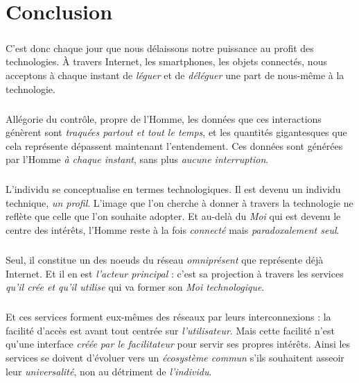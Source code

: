 \chapter{Conclusion}

\paragraph{} C'est donc chaque jour que nous délaissons notre puissance au profit des
technologies. À travers Internet, les smartphones, les objets connectés, nous acceptons
à chaque instant de \emph{léguer} et de \emph{déléguer} une part de nous-même à la 
technologie. 

\paragraph{} Allégorie du contrôle, propre de l'Homme, les données que ces
interactions génèrent sont \emph{traquées partout et tout le temps}, et les quantités
gigantesques que cela représente dépassent maintenant l'entendement. Ces données sont
générées par l'Homme \emph{à chaque instant}, sans plus \emph{aucune interruption}. 

\paragraph{} L'individu se conceptualise en termes technologiques. Il est devenu un
individu technique, \emph{un profil}. L'image que l'on cherche à donner à travers la
technologie ne reflète que celle que l'on souhaite adopter. Et au-delà du \emph{Moi}
qui est devenu le centre des intérêts, l'Homme reste à la fois \emph{connecté} mais
\emph{paradoxalement seul}.

\paragraph{} Seul, il constitue un des noeuds du réseau \emph{omniprésent} que représente
déjà Internet. Et il en est \emph{l'acteur principal} : c'est sa projection à travers
les services \emph{qu'il crée et qu'il utilise} qui va former son \emph{Moi technologique}.

\paragraph{} Et ces services forment eux-mêmes des réseaux par leurs interconnexions : la facilité
d'accès est avant tout centrée sur \emph{l'utilisateur}. Mais cette facilité n'est qu'une interface
\emph{créée par le facilitateur} pour servir ses propres intérêts. Ainsi les services se doivent
d'évoluer vers un \emph{écosystème commun} s'ils souhaitent asseoir leur \emph{universalité},
non au détriment de \emph{l'individu}. 

